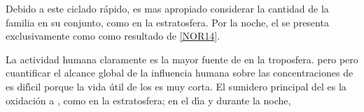 Debido a este ciclado r\'apido, es mas apropiado considerar la cantidad de la familia   en su conjunto, como en la estratosfera. Por la noche, el   se presenta exclusivamente como  como resultado de \ref{NOR14}.

La actividad humana claramente es la mayor fuente de  en la troposfera. pero  pero cuantificar el alcance global de la influencia humana sobre las concentraciones de  es dif\'{\i}cil porque la vida \'util de los  es muy corta. El sumidero principal del  es la oxidaci\'on a , como en la estratosfera; en el d\'{\i}a 
y durante la noche,

